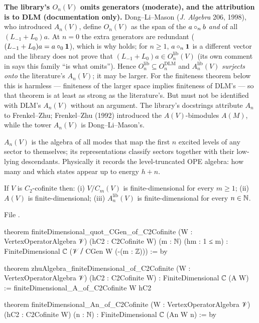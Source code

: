 \begin{warning}
\textbf{The library's $O_n(V)$ omits generators (moderate), and the attribution is to DLM (documentation only).} Dong--Li--Mason
(\emph{J. Algebra} 206, 1998), who introduced $A_n(V)$, define $O_n(V)$ as the span of the $a\circ_nb$
\emph{and} of all $(L_{-1}+L_0)a$. At $n = 0$ the extra generators are redundant ($(L_{-1}+L_0)a = a\circ_0\mathbf{1}$),
which is why  holds; for $n\ge1$, $a\circ_n\mathbf{1}$ is a different vector and the library does
not prove that $(L_{-1}+L_0)a\in O_n^{\mathrm{lib}}(V)$ (its own comment in
 says this family ``is what  omits'').
Hence $O_n^{\mathrm{lib}}\subseteq O_n^{\mathrm{DLM}}$ and $A_n^{\mathrm{lib}}(V)$ \emph{surjects onto} the literature's
$A_n(V)$; it may be larger. For the finiteness theorem below this is harmless --- finiteness of the larger space
implies finiteness of DLM's --- so that theorem is at least as strong as the literature's. But
 must not be identified with DLM's $A_n(V)$ without an argument. The library's docstrings attribute
$A_n$ to Frenkel--Zhu; Frenkel--Zhu (1992) introduced the $A(V)$-bimodules $A(M)$, while the tower $A_n(V)$ is
Dong--Li--Mason's.
\end{warning}

\begin{physics}
$A_n(V)$ is the algebra of all modes that map the first $n$ excited levels of any sector to themselves; its
representations classify sectors together with their low-lying descendants. Physically it records the
level-truncated OPE algebra: how many and which states appear up to energy $h+n$.
\end{physics}

\begin{theorem}\label{l12:thm:an}
If $V$ is $C_2$-cofinite then: (i) $V/C_m(V)$ is finite-dimensional for every $m\ge1$; (ii) $A(V)$ is
finite-dimensional; (iii) $A_n^{\mathrm{lib}}(V)$ is finite-dimensional for every $n\in{\mathbb{N}}$.
\end{theorem}
\noindent File .
\begin{leancode}
theorem finiteDimensional_quot_CGen_of_C2Cofinite (W : VertexOperatorAlgebra 𝒱)
    (hC2 : C2Cofinite W) (m : ℕ) (hm : 1 ≤ m) :
    FiniteDimensional ℂ (𝒱 ⧸ CGen W (-(m : ℤ))) := by

theorem zhuAlgebra_finiteDimensional_of_C2Cofinite (W : VertexOperatorAlgebra 𝒱)
    (hC2 : C2Cofinite W) : FiniteDimensional ℂ (A W) :=
  finiteDimensional_A_of_C2Cofinite W hC2

theorem finiteDimensional_An_of_C2Cofinite (W : VertexOperatorAlgebra 𝒱)
    (hC2 : C2Cofinite W) (n : ℕ) : FiniteDimensional ℂ (An W n) := by
\end{leancode}

